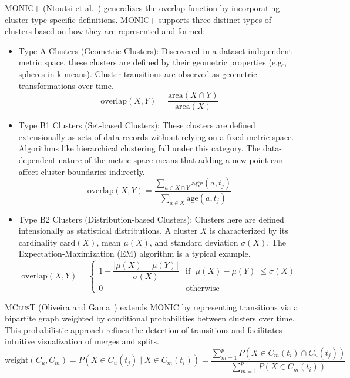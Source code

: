 \textsc{MONIC+} (Ntoutsi et al.~\cite{monic_plus}) generalizes the overlap function by incorporating cluster-type-specific
definitions. MONIC+ supports three distinct types of clusters based on how they are represented and formed:
\begin{itemize}
    \item Type A Clusters (Geometric Clusters): Discovered in a dataset-independent
          metric space, these clusters are defined by their geometric properties (e.g.,
          spheres in k-means). Cluster transitions are observed as geometric
          transformations over time.
          \begin{equation}
              \text{overlap}(X,Y) = \frac{\text{area}(X \cap Y)}{\text{area}(X)}
          \end{equation}
    \item Type B1 Clusters (Set-based Clusters): These clusters are defined extensionally
          as sets of data records without relying on a fixed metric space. Algorithms
          like hierarchical clustering fall under this category. The data-dependent
          nature of the metric space means that adding a new point can affect cluster
          boundaries indirectly.
          \begin{equation}
              \text{overlap}(X,Y) = \frac{\sum_{a \in X \cap Y} \text{age}(a, t_j)}{\sum_{a \in X} \text{age}(a, t_j)}
          \end{equation}
    \item Type B2 Clusters (Distribution-based Clusters): Clusters here are defined
          intensionally as statistical distributions. A cluster $X$ is characterized by
          its cardinality $\text{card}(X)$, mean $\mu(X)$, and standard deviation
          $\sigma(X)$. The Expectation-Maximization (EM) algorithm is a typical example.
          \begin{equation}
              \text{overlap}(X, Y) =
              \begin{cases}
                  1 - \dfrac{|\mu(X) - \mu(Y)|}{\sigma(X)} & \text{if } |\mu(X) - \mu(Y)| \leq \sigma(X) \\
                  0                                        & \text{otherwise}
              \end{cases}
          \end{equation}
\end{itemize}

\textsc{MClusT} (Oliveira and Gama~\cite{mclust}) extends MONIC by representing transitions via a
bipartite graph weighted by conditional probabilities between clusters over time.
This probabilistic approach refines the detection of transitions and facilitates intuitive
visualization of merges and splits.
\begin{equation}
    \text{weight}(C_u, C_m) = P(X \in C_u(t_j) \mid X \in C_m(t_i)) =
    \frac{\sum_{m=1}^p P(X \in C_m(t_i) \cap C_u(t_j))}{\sum_{m=1}^p P(X \in C_m(t_i))}
\end{equation}

